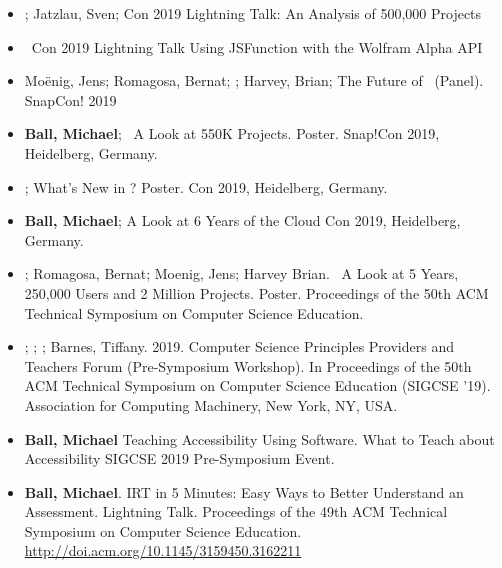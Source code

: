 \begin{itemize}
    \item{\me; Jatzlau, Sven; \snap{}Con 2019 Lightning Talk: An Analysis of 500,000 \snap Projects}
    
    \item{\me\ \snap{}Con 2019 Lightning Talk Using JSFunction with the Wolfram Alpha API}
    
    \item{Moënig, Jens; Romagosa, Bernat; \me; Harvey, Brian; The Future of \snap\ (Panel). SnapCon! 2019}
    
    
    \item{\textbf{Ball, Michael}; \snap\ A Look at 550K Projects. Poster. Snap!Con 2019, Heidelberg, Germany.}
    
    \item{\me; What's New in ? Poster. \snap{}Con 2019, Heidelberg, Germany.}
    
    \item{\textbf{Ball, Michael}; A Look at 6 Years of the \snap{}Cloud \snap{}Con 2019, Heidelberg, Germany.}
    
    
    \item{\me; Romagosa, Bernat; Moenig, Jens; Harvey Brian. \snap\ A Look at 5 Years, 250,000 Users and 2 Million Projects. Poster. Proceedings of the 50th ACM Technical Symposium on Computer Science Education.}
    
    \item{\lauren; \me; \dan; Barnes, Tiffany. 2019. Computer Science Principles Providers and Teachers Forum (Pre-Symposium Workshop). In Proceedings of the 50th ACM Technical Symposium on Computer Science Education (SIGCSE '19). Association for Computing Machinery, New York, NY, USA.}
    
    \item{\textbf{Ball, Michael} Teaching Accessibility Using Software. What to Teach about Accessibility SIGCSE 2019 Pre-Symposium Event.}
    
    \item{\textbf{Ball, Michael}. IRT in 5 Minutes: Easy Ways to Better Understand an Assessment. Lightning Talk. Proceedings of the 49th ACM Technical Symposium on Computer Science Education.} \href{http://doi.acm.org/10.1145/3159450.3162211}{http://doi.acm.org/10.1145/3159450.3162211}


\end{itemize}
